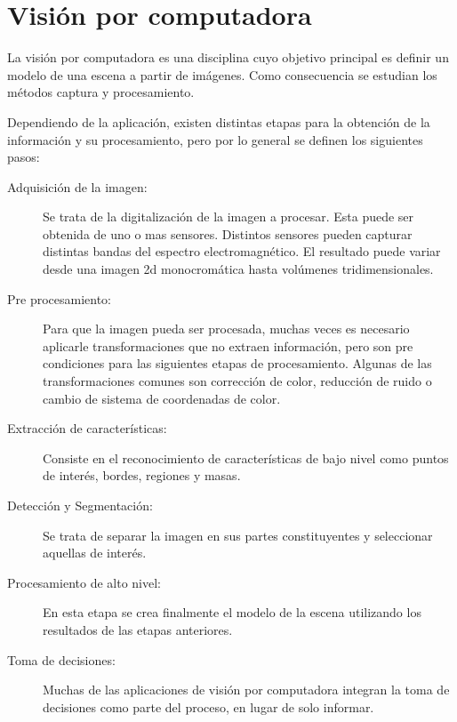 
\section{Visión por computadora}

La visión por computadora es una disciplina cuyo objetivo principal es definir
un modelo de una escena a partir de imágenes\cite{cvLinda2001}. Como
consecuencia se estudian los métodos captura y procesamiento.

Dependiendo de la aplicación, existen distintas etapas para la obtención de la
información y su procesamiento, pero por lo general se definen los siguientes
pasos\cite{digitalImageProcessing2ed, wikiCV}:

\begin{description}

\item[Adquisición de la imagen:] Se trata de la digitalización de la imagen a
	procesar. Esta puede ser obtenida de uno o mas sensores. Distintos
	sensores pueden capturar distintas bandas del espectro electromagnético.
	El resultado puede variar desde una imagen 2d monocromática hasta
	volúmenes tridimensionales.

\item[Pre procesamiento:] Para que la imagen pueda ser procesada, muchas veces
	es necesario aplicarle transformaciones que no extraen información, pero
	son pre condiciones para las siguientes etapas de procesamiento. Algunas
	de las transformaciones comunes son corrección de color, reducción de
	ruido o cambio de sistema de coordenadas de color.

\item[Extracción de características:] Consiste en el reconocimiento de
	características de bajo nivel como puntos de interés, bordes, regiones y
	masas.

\item[Detección y Segmentación:] Se trata de separar la imagen en sus partes
	constituyentes y seleccionar aquellas de interés.

\item[Procesamiento de alto nivel:] En esta etapa se crea finalmente el modelo
	de la escena utilizando los resultados de las etapas anteriores.

\item[Toma de decisiones:] Muchas de las aplicaciones de visión por computadora
	integran la toma de decisiones como parte del proceso, en lugar de solo
	informar.

\end{description}
